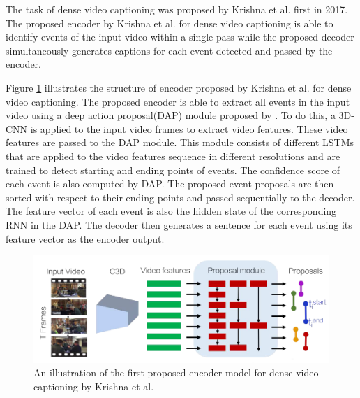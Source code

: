 \documentclass[preprint, 12pt]{elsarticle}
\begin{document}
		The task of dense video captioning was proposed by Krishna et al. \cite{krishna2017dense} first in 2017. The proposed encoder by Krishna et al. \cite{krishna2017dense} for dense video captioning is able to identify events of the input video within a single pass while the proposed decoder simultaneously generates captions for each event detected and passed by the encoder.
		
		Figure \ref{fig:dense1} illustrates the structure of encoder proposed by Krishna et al. \cite{krishna2017dense} for dense video captioning. The proposed encoder is able to extract all events in the input video using a deep action proposal(DAP) module proposed by \cite{escorcia2016daps}. To do this, a 3D-CNN is applied to the input video frames to extract video features. These video features are passed to the DAP module. This module consists of different LSTMs that are applied to the video features sequence in different resolutions and are trained to detect starting and ending points of events. The confidence score of each event is also computed by DAP. The proposed event proposals are then sorted with respect to their ending points and passed sequentially to the decoder. The feature vector of each event is also the hidden state of the corresponding RNN in the DAP. The decoder then generates a sentence for each event using its feature vector as the encoder output.
		
		\begin{figure}[h]
			\centering
			\includegraphics[scale=0.4]{Imgs/dense1.png}
			\caption{An illustration of the first proposed encoder model for dense video captioning by Krishna et al. \cite{krishna2017dense}}
			\label{fig:dense1}
		\end{figure}
	
\end{document}
